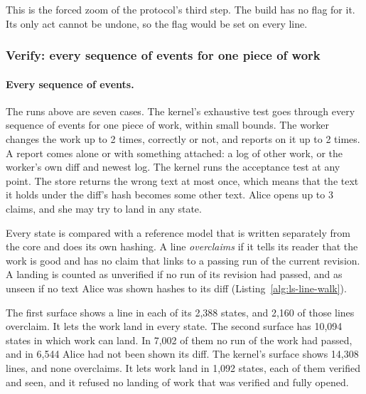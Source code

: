 This is the forced zoom of the protocol's third step. The build has no
flag for it. Its only act cannot be undone, so the flag would be set on
every line.


\subsubsection{Verify: every sequence of events for one piece of work}

\paragraph{Every sequence of events.}
The runs above are seven cases. The kernel's exhaustive test goes through
every sequence of events for one piece of work, within small bounds. The
worker changes the work up to 2 times, correctly or not, and reports on it
up to 2 times. A report comes alone or with something attached: a log of
other work, or the worker's own diff and newest log. The kernel runs the
acceptance test at any point. The store returns the wrong text at most
once, which means that the text it holds under the diff's hash becomes
some other text. Alice opens up to 3 claims, and she may try to land in
any state.

Every state is compared with a reference model that is written separately
from the core and does its own hashing. A line \emph{overclaims} if it
tells its reader that the work is good and has no claim that links to a
passing run of the current revision. A landing is counted as unverified if
no run of its revision had passed, and as unseen if no text Alice was
shown hashes to its diff (Listing~\ref{alg:ls-line-walk}).


The first surface shows a line in each of its 2,388 states, and 2,160 of
those lines overclaim. It lets the work land in every state. The second
surface has 10,094 states in which work can land. In 7,002 of them no run
of the work had passed, and in 6,544 Alice had not been shown its diff.
The kernel's surface shows 14,308 lines, and none overclaims. It lets work
land in 1,092 states, each of them verified and seen, and it refused no
landing of work that was verified and fully opened.


